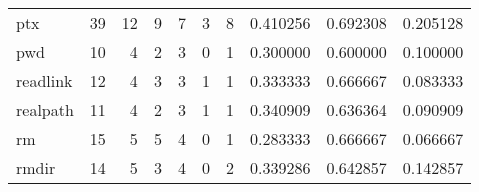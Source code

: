 \begin{longtable}{lrrrrrrrrr}
ptx       &                                      39 &                                                 12 &                                                  9 &                                                  7 &                                                  3 &                                                  8 &                                           0.410256 &                               0.692308 &                             0.205128 \\
pwd       &                                      10 &                                                  4 &                                                  2 &                                                  3 &                                                  0 &                                                  1 &                                           0.300000 &                               0.600000 &                             0.100000 \\
readlink  &                                      12 &                                                  4 &                                                  3 &                                                  3 &                                                  1 &                                                  1 &                                           0.333333 &                               0.666667 &                             0.083333 \\
realpath  &                                      11 &                                                  4 &                                                  2 &                                                  3 &                                                  1 &                                                  1 &                                           0.340909 &                               0.636364 &                             0.090909 \\
rm        &                                      15 &                                                  5 &                                                  5 &                                                  4 &                                                  0 &                                                  1 &                                           0.283333 &                               0.666667 &                             0.066667 \\
rmdir     &                                      14 &                                                  5 &                                                  3 &                                                  4 &                                                  0 &                                                  2 &                                           0.339286 &                               0.642857 &                             0.142857 \\

\end{longtable}
